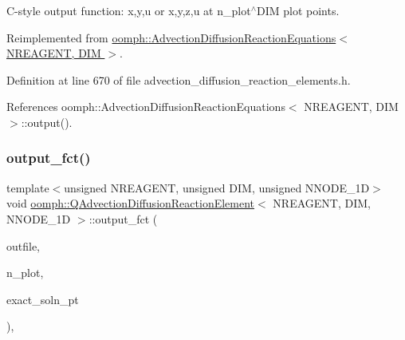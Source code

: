 C-\/style output function\+: x,y,u or x,y,z,u at n\+\_\+plot$^\wedge$\+D\+IM plot points. 



Reimplemented from \hyperlink{classoomph_1_1AdvectionDiffusionReactionEquations_a1ada1e57cac4bff9ecf73520a907b7c8}{oomph\+::\+Advection\+Diffusion\+Reaction\+Equations$<$ N\+R\+E\+A\+G\+E\+N\+T, D\+I\+M $>$}.



Definition at line 670 of file advection\+\_\+diffusion\+\_\+reaction\+\_\+elements.\+h.



References oomph\+::\+Advection\+Diffusion\+Reaction\+Equations$<$ N\+R\+E\+A\+G\+E\+N\+T, D\+I\+M $>$\+::output().

\mbox{\label{classoomph_1_1QAdvectionDiffusionReactionElement_a4dcfb4e1778ee7e46c86609ea4d1ce30}} 
\subsubsection{\texorpdfstring{output\+\_\+fct()}{output\_fct()}\hspace{0.1cm}{\footnotesize\ttfamily [1/2]}}
{\footnotesize\ttfamily template$<$unsigned N\+R\+E\+A\+G\+E\+NT, unsigned D\+IM, unsigned N\+N\+O\+D\+E\+\_\+1D$>$ \\
void \hyperlink{classoomph_1_1QAdvectionDiffusionReactionElement}{oomph\+::\+Q\+Advection\+Diffusion\+Reaction\+Element}$<$ N\+R\+E\+A\+G\+E\+NT, D\+IM, N\+N\+O\+D\+E\+\_\+1D $>$\+::output\+\_\+fct (\begin{DoxyParamCaption}\item[{std\+::ostream \&}]{outfile,  }\item[{const unsigned \&}]{n\+\_\+plot,  }\item[{\hyperlink{classoomph_1_1FiniteElement_a690fd33af26cc3e84f39bba6d5a85202}{Finite\+Element\+::\+Steady\+Exact\+Solution\+Fct\+Pt}}]{exact\+\_\+soln\+\_\+pt }\end{DoxyParamCaption})\hspace{0.3cm}{\ttfamily [inline]}, {\ttfamily [virtual]}}



